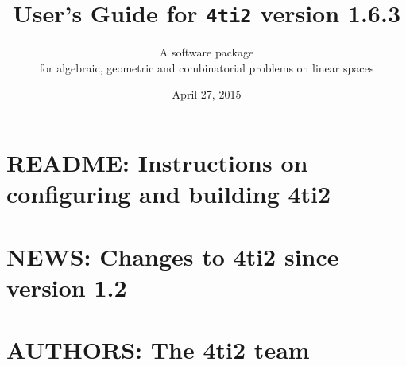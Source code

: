 \documentclass[12pt,a4]{book}
\newcommand{\1}{{\bf 1}}
\newcommand{\FourTiTwo}{{\tt 4ti2}}
\begin{document}
\thispagestyle{empty}

\title{User's Guide for \FourTiTwo{} version 1.6.3}

\author{A software package\\ for algebraic,
geometric and combinatorial problems on linear spaces}
\date{April 27, 2015}

\maketitle

\newpage
\thispagestyle{empty}


\tableofcontents







\chapter{README: Instructions on configuring and building 4ti2}

{\small

}

\chapter{NEWS: Changes to 4ti2 since version 1.2}

{\small

}

\clearpage
{}
\chapter*{AUTHORS: The 4ti2 team}



\clearpage
{}



\clearpage

\end{document}
